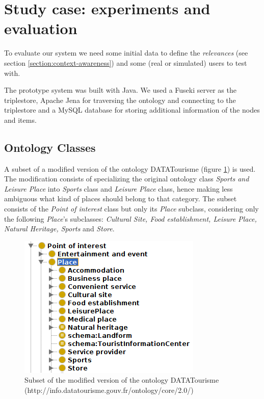 \section{Study case: experiments and evaluation}
To evaluate our system we need some initial data to define the \textit{relevances} (see section \ref{section:context-awareness}) and some (real or simulated) users to test with.

The prototype system was built with Java. We used a Fuseki server as the triplestore, Apache Jena for traversing the ontology and connecting to the triplestore and a MySQL database for storing additional information of the nodes and items.

\subsection{Ontology Classes}
A subset of a modified version of the ontology DATATourisme (figure \ref{fig:ontology}) is used. The modification consists of specializing the original ontology class \textit{Sports and Leisure Place} into \textit{Sports} class and \textit{Leisure Place} class, hence making less ambiguous what kind of places should belong to that category. The subset consists of the \textit{Point of interest} class but only its \textit{Place} subclass, considering only the following \textit{Place}'s subclasses: \textit{Cultural Site, Food establishment, Leisure Place, Natural Heritage, Sports} and \textit{Store}. 


\begin{figure}[h]
\centering
\includegraphics[scale=0.5]{ontology.png}
\caption{Subset of the modified version of the ontology DATATourisme (http://info.datatourisme.gouv.fr/ontology/core/2.0/)}
\label{fig:ontology}
\end{figure}

